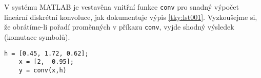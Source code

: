 \begin{tkyexam}
    V systému \textsc{MATLAB} je vestavěna vnitřní funkce \lstinline[style=luaMatlabText]!conv! pro
    snadný výpočet lineární diskrétní konvoluce, jak dokumentuje výpis \ref{tky:lst001}. Vyzkoušejme
    si, že obrátíme-li pořadí proměnných v příkazu \lstinline[style=luaMatlabText]!conv!, vyjde
    shodný výsledek (komutace symbolů).

  \begin{lstlisting}[style=luaMatlabText,gobble=4, label={tky:lst001}]
    h = [0.45, 1.72, 0.62];
    x = [2,  0.95];
    y = conv(x,h)
  \end{lstlisting}

\end{tkyexam}